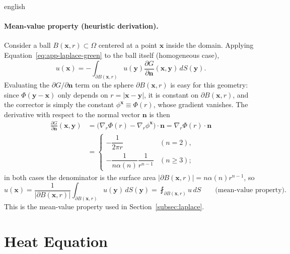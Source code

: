 \documentclass[12pt,letterpaper,twoside]{book}
\newcommand{\abs}[1]{\left\lvert #1 \right\rvert}
\begin{document}
\begin{hyphenrules}{english}
\paragraph{Mean-value property (heuristic derivation).}
Consider a ball $B(\mathbf{x},r)\subset\Omega$ centered at a point $\mathbf{x}$ inside the domain. Applying
Equation~\eqref{eq:app-laplace-green} to the ball itself (homogeneous case),
\begin{equation}
  u(\mathbf{x})=-\int_{\partial B(\mathbf{x},r)}u(\mathbf{y})\frac{\partial G}{\partial\mathbf{n}}(\mathbf{x},\mathbf{y})\,d S(\mathbf{y}).
  \label{eq:mvp-1}
\end{equation}
Evaluating the $\partial G/\partial\mathbf{n}$ term on the sphere $\partial B(\mathbf{x},r)$ is easy for this geometry:
since $\Phi(\mathbf{y}-\mathbf{x})$ only depends on $r=\abs{\mathbf{x}-\mathbf{y}}$, it is constant on $\partial B(\mathbf{x},r)$, and the
corrector is simply the constant $\phi^{\mathbf{x}}\equiv\Phi(r)$, whose gradient vanishes. The derivative with
respect to the normal vector $\mathbf{n}$ is then
\begin{align}
  \frac{\partial G}{\partial\mathbf{n}}(\mathbf{x},\mathbf{y})
    &=\big(\nabla_r\Phi(r)-\nabla_r\phi^{\mathbf{x}}\big)\cdot\mathbf{n}=\nabla_r\Phi(r)\cdot\mathbf{n} \label{eq:mvp-2}\\
    &=\begin{cases}
        -\dfrac{1}{2\pi r} & (n=2),\\[2mm]
        -\dfrac{1}{n\alpha(n)}\dfrac{1}{r^{n-1}} & (n\ge3);
      \end{cases} \label{eq:mvp-3}
\end{align}
in both cases the denominator is the surface area $\abs{\partial B(\mathbf{x},r)}=n\alpha(n)r^{n-1}$, so
\begin{equation}
  u(\mathbf{x})=\frac{1}{\abs{\partial B(\mathbf{x},r)}}\int_{\partial B(\mathbf{x},r)}u(\mathbf{y})\,d S(\mathbf{y})
  =\fint_{\partial B(\mathbf{x},r)}u\,d S \qquad\text{(mean-value property)}.
  \label{eq:app-mvp}
\end{equation}
This is the mean-value property used in Section~\ref{subsec:laplace}.

\section{Heat Equation}\label{app-sec:heat}


\end{hyphenrules}
\end{document}
